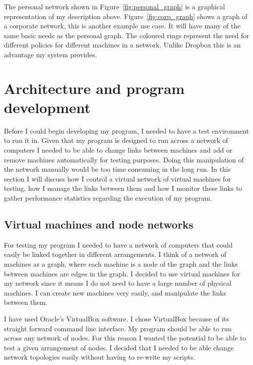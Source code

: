 \documentclass[12pt]{article}
\begin{document}
The personal network shown in
Figure~\ref{fig:personal_graph} is a graphical representation
of my description above. Figure~\ref{fig:corp_graph}
shows a graph of a corporate network, this
is another example use case. It will have many of the same
basic needs as the personal graph. The coloured rings represent
the need for different policies for different machines in a network.
Unlike Dropbox this is an advantage my system provides.


\newpage
\section{Architecture and program development}
Before I could begin developing my program, I needed to
have a test environment to run it in. Given that my program
is designed to run across a network of computers I needed
to be able to change links between machines and add or
remove machines automatically for testing purposes.
Doing this manipulation of the network manually would be too time consuming
in the long run. In this section I will discuss how I
control a virtual network of virtual machines for testing, how
I manage the links between them and how I monitor
these links to gather performance statistics regarding the
execution of my program.

\subsection{Virtual machines and node networks}
\label{sec:vm_network}
For testing my program I needed to have a network
of computers that could easily be linked together in different
arrangements. I think of a network of machines as a graph, where
each machine is a node of the graph and the links between machines
are edges in the graph. I decided to use virtual machines for
my network since it means I do not need to have a large number
of physical machines. I can create new machines very easily,
and manipulate the links between them.

I have used Oracle's VirtualBox software. I chose
VirtualBox because of its straight forward command
line interface.
My program should be able to run across
any network of nodes. For this reason I wanted
the potential to be able to test a given arrangement
of nodes.
I decided that I needed to be able change network
topologies easily without having to re-write
my scripts. 
\end{document}
